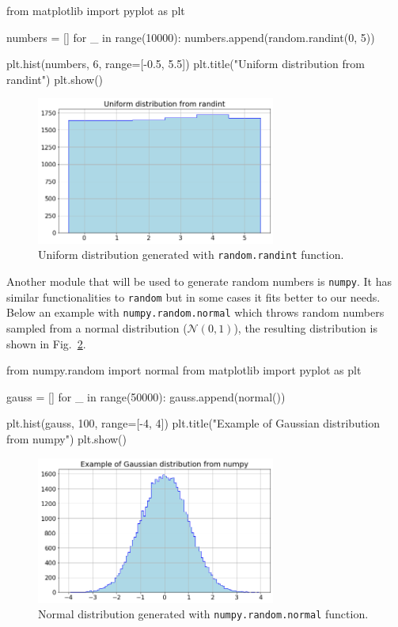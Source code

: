 \begin{ipython}
from matplotlib import pyplot as plt

numbers = []
for _ in range(10000):
    numbers.append(random.randint(0, 5))

plt.hist(numbers, 6, range=[-0.5, 5.5])
plt.title("Uniform distribution from randint")
plt.show()
\end{ipython}

\begin{figure}[h]
\centering
\includegraphics[width=0.7\textwidth]{figures/uniform}
\caption{Uniform distribution generated with \texttt{random.randint} function.}
\label{fig:uniform_dist}
\end{figure}
    
Another module that will be used to generate random numbers is \texttt{numpy}. It has similar functionalities to \texttt{random} but in some cases it fits better to our needs.    
Below an example with \texttt{numpy.random.normal} which throws random numbers sampled from a normal distribution (\(\mathcal{N}(0, 1)\)), the resulting distribution is shown in Fig.~\ref{fig:gauss_dist}.

\begin{ipython}
from numpy.random import normal
from matplotlib import pyplot as plt

gauss = []
for _ in range(50000):
    gauss.append(normal())

plt.hist(gauss, 100, range=[-4, 4])
plt.title("Example of Gaussian distribution from numpy")
plt.show()
\end{ipython}

\begin{figure}
\centering
\includegraphics[width=0.7\textwidth]{figures/standard_normal}
\caption{Normal distribution generated with \texttt{numpy.random.normal} function.}
\label{fig:gauss_dist}
\end{figure}

